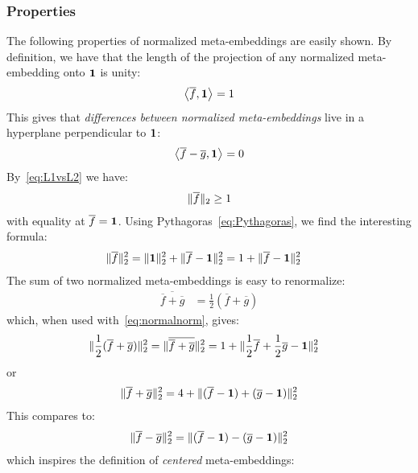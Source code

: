 \documentclass[a4paper,oneside,12pt,english]{report}
\def\expv#1#2{\bigl\langle#1\bigr\rangle_{#2}}
\def\dot#1#2{\expv{#1,#2}{}}
\def\normal#1{\overline{#1}}
\begin{document}
\subsubsection{Properties}
The following properties of normalized meta-embeddings are easily shown. By definition, we have that the length of the projection of any normalized meta-embedding onto $\boldsymbol{1}$ is unity:
\begin{align}
\label{eq:LR1}
\dot{\normal{f}}{\onevec} = 1
\end{align}
This gives that \emph{differences between normalized meta-embeddings} live in a hyperplane perpendicular to $\boldsymbol{1}$: 
\begin{align}
\dot{\normal{f}-\normal{g}}{\onevec} = 0
\end{align}
By~\eqref{eq:L1vsL2} we have:
\begin{align}
\norm{\normal{f}} \ge 1
\end{align} 
with equality at $\normal{f}=\onevec$. Using Pythagoras~\eqref{eq:Pythagoras}, we find the interesting formula:
\begin{align}
\label{eq:normalnorm}
\norm{\normal{f}}^2 &= \norm{\onevec}^2 + \norm{\normal{f}-\onevec}^2 
= 1 + \norm{\normal{f}-\onevec}^2 
\end{align}
The sum of two normalized meta-embeddings is easy to renormalize:
\begin{align}
\normal{\normal{f}+\normal{g}} &= \frac12(\normal{f}+\normal{g})
\end{align}
which, when used with~\eqref{eq:normalnorm}, gives:
\begin{align}
\norm{\frac12(\normal{f}+\normal{g})}^2 &= \norm{\normal{\normal{f}+\normal{g}}}^2
= 1 + \norm{\frac12\normal{f}+\frac12\normal{g}-\onevec}^2
\end{align}
or
\begin{align}
\norm{\normal{f}+\normal{g}}^2 
= 4 + \norm{(\normal{f}-\onevec)+(\normal{g}-\onevec)}^2
\end{align}
This compares to:
\begin{align}
\norm{\normal{f}-\normal{g}}^2 
= \norm{(\normal{f}-\onevec)-(\normal{g}-\onevec)}^2
\end{align}
which inspires the definition of \emph{centered} meta-embeddings:	
	
\end{document}
